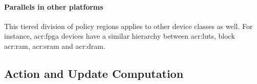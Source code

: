 \paragraph{Parallels in other platforms}
This tiered division of policy regions applies to other device classes as well.
For instance, \gls{acr:fpga} devices have a similar hierarchy between \glspl{acr:lut}, block \gls{acr:ram}, \gls{acr:sram} and \gls{acr:dram}.

\subsection{Action and Update Computation}\label{sec:action-and-update-computation}


